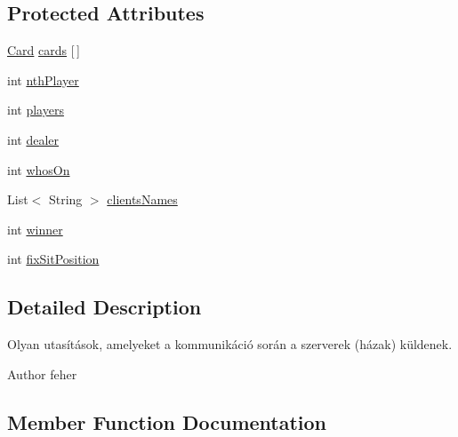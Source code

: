 \subsection*{Protected Attributes}
\begin{DoxyCompactItemize}
\item 
\hyperlink{classcom_1_1cantero_1_1games_1_1poker_1_1texasholdem_1_1_card}{Card} \hyperlink{classhu_1_1elte_1_1bfw1p6_1_1poker_1_1command_1_1_house_command_a2415f2465575a55375e7984a075eb17c}{cards} \mbox{[}$\,$\mbox{]}
\item 
int \hyperlink{classhu_1_1elte_1_1bfw1p6_1_1poker_1_1command_1_1_house_command_a0592c2c67cdbae03558800fe9de2cc67}{nth\+Player}
\item 
int \hyperlink{classhu_1_1elte_1_1bfw1p6_1_1poker_1_1command_1_1_house_command_a5aec73db52970865d234f95422258887}{players}
\item 
int \hyperlink{classhu_1_1elte_1_1bfw1p6_1_1poker_1_1command_1_1_house_command_ae5e581e4c28506423b19a4caa265257b}{dealer}
\item 
int \hyperlink{classhu_1_1elte_1_1bfw1p6_1_1poker_1_1command_1_1_house_command_ad2d082dbec0a324d62472e5c48ef257f}{whos\+On}
\item 
List$<$ String $>$ \hyperlink{classhu_1_1elte_1_1bfw1p6_1_1poker_1_1command_1_1_house_command_a41ce088d49cf17e5f8a28d4beba6e691}{clients\+Names}
\item 
int \hyperlink{classhu_1_1elte_1_1bfw1p6_1_1poker_1_1command_1_1_house_command_a7dc7a32601c36758c216ddca0fc9999e}{winner}
\item 
int \hyperlink{classhu_1_1elte_1_1bfw1p6_1_1poker_1_1command_1_1_house_command_a4861bc89971a340d51152e58a33d6689}{fix\+Sit\+Position}
\end{DoxyCompactItemize}


\subsection{Detailed Description}
Olyan utasítások, amelyeket a kommunikáció során a szerverek (házak) küldenek. \begin{DoxyAuthor}{Author}
feher 
\end{DoxyAuthor}


\subsection{Member Function Documentation}
\hypertarget{classhu_1_1elte_1_1bfw1p6_1_1poker_1_1command_1_1_house_command_a2685f9ebb713974d6731804f7f421e5b}{}
